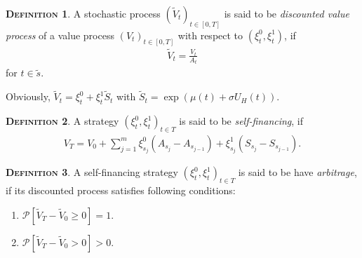\documentclass[a4paper, twoside, 11pt]{article}
\theoremstyle{definition}
\newtheorem{definition}{\scshape Definition}[section]
\begin{document}
  \begin{definition}
	A stochastic process $(\tilde{V}_t)_{t\in[0,T]}$ is said to be \emph{discounted value process} of a value process $(V_t)_{t\in [0, T]}$ with respect to $(\xi_t^0, \xi_t^1)$, if 
	\begin{eqnarray*}
	  \tilde{V}_t = \frac{V_t}{A_t}
	\end{eqnarray*}
	for $t \in \tilde{s}$.
  \end{definition}
  Obviously, $\tilde{V}_t = \xi^0_t + \xi^1_t \tilde{S}_t$ with $\tilde{S}_t=\exp(\mu(t) + \sigma U_H(t))$.
  \begin{definition}
	A strategy $(\xi^0_t, \xi^1_t)_{t\in T}$ is said to be \emph{self-financing}, if
	\begin{eqnarray}
	  V_T = V_0 + \sum_{j=1}^{m} \xi^0_{s_j} (A_{s_{j}} - A_{s_{j-1}}) + \xi^1_{s_j} (S_{s_{j}} - S_{s_{j-1}}). 
	  \label{sec:123}
	\end{eqnarray}
	\label{sec:def}
  \end{definition}

  \begin{definition}
	A self-financing strategy $(\xi^0_t, \xi^1_t)_{t\in T}$ is said to be have \emph{arbitrage}, if its discounted process satisfies following conditions:
	\begin{enumerate}[topsep=0pt, itemsep=-1ex, partopsep=1ex, parsep=1ex, label=(\roman*)]
	  \item $\mathcal{P}[\tilde{V}_T - \tilde{V}_0 \ge 0] = 1$.
	  \item $\mathcal{P}[\tilde{V}_T - \tilde{V}_0 > 0] > 0$.
	  \end{enumerate}
	\end{definition}
\end{document}
